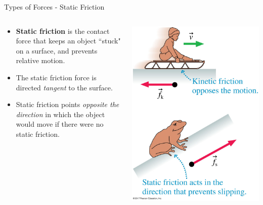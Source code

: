 \documentclass{beamer}
\begin{document}
 \begin{frame}{Types of Forces - Static Friction}
\begin{columns}
\begin{column}{0.6\textwidth}
\begin{itemize}
   \item {\bf Static friction} is the contact force that keeps an object ``stuck" on a surface, and prevents relative motion. 
   \item The static friction force is directed {\it tangent} to the surface.
   \item Static friction points {\it opposite the direction} in which the object would move if there were no static friction.
\end{itemize}
\end{column}
\begin{column}{0.4\textwidth}
\begin{center}
   \includegraphics[width=\textwidth,trim={0 0 0 9cm},clip]{../figures/05_08_Figure.jpg}
\end{center}
\end{column}
\end{columns}
\end{frame}
\end{document}
